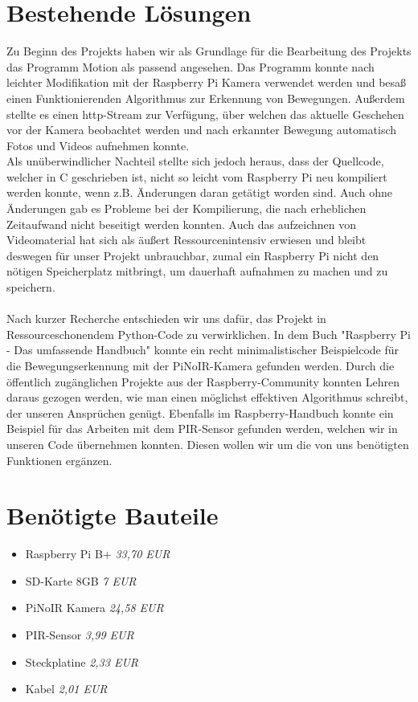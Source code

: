 \documentclass[9pt,a4paper]{IEEEtran}
\begin{document}
\section{Bestehende Lösungen} 
Zu Beginn des Projekts haben wir als Grundlage für die Bearbeitung des Projekts das Programm Motion\cite{motion} als passend angesehen. 
Das Programm konnte nach leichter Modifikation mit der Raspberry Pi Kamera verwendet werden und besaß einen Funktionierenden Algorithmus zur Erkennung von Bewegungen. 
Außerdem stellte es einen http-Stream zur Verfügung, über welchen das aktuelle Geschehen vor der Kamera beobachtet werden und nach erkannter Bewegung automatisch Fotos und Videos aufnehmen konnte. 
\\ 
Als unüberwindlicher Nachteil stellte sich jedoch heraus, dass der Quellcode, welcher in C geschrieben ist, nicht so leicht vom Raspberry Pi neu kompiliert werden konnte, wenn z.B. Änderungen daran getätigt worden sind. 
Auch ohne Änderungen gab es Probleme bei der Kompilierung, die nach erheblichen Zeitaufwand nicht beseitigt werden konnten. 
Auch das aufzeichnen von Videomaterial hat sich als äußert Ressourcenintensiv erwiesen und bleibt deswegen für unser Projekt unbrauchbar, zumal ein Raspberry Pi nicht den nötigen Speicherplatz mitbringt, um dauerhaft aufnahmen zu machen und zu speichern.
\\ \\
Nach kurzer Recherche entschieden wir uns dafür, das Projekt in Ressourceschonendem Python-Code zu verwirklichen.
In dem Buch "Raspberry Pi - Das umfassende Handbuch" konnte ein recht minimalistischer Beispielcode für die Bewegungserkennung mit der PiNoIR-Kamera gefunden werden\cite[S. XXX]{Raspi}.  
Durch die öffentlich zugänglichen Projekte aus der Raspberry-Community konnten Lehren daraus gezogen werden, wie man einen möglichst effektiven Algorithmus schreibt, der unseren Ansprüchen genügt. 
Ebenfalls im Raspberry-Handbuch konnte ein Beispiel für das Arbeiten mit dem PIR-Sensor gefunden werden\cite[S. 495]{Raspi}, welchen wir in unseren Code übernehmen konnten.
Diesen wollen wir um die von uns benötigten Funktionen ergänzen.





\section{Benötigte Bauteile}
\begin{itemize}
\item Raspberry Pi B+ \textit{33,70 EUR} 
\item SD-Karte 8GB \textit{7 EUR}
\item PiNoIR Kamera \textit{24,58 EUR}
\item PIR-Sensor \textit{3,99 EUR}
\item Steckplatine \textit{2,33 EUR}
\item Kabel \textit{2,01 EUR}
\end{itemize}
\end{document}
